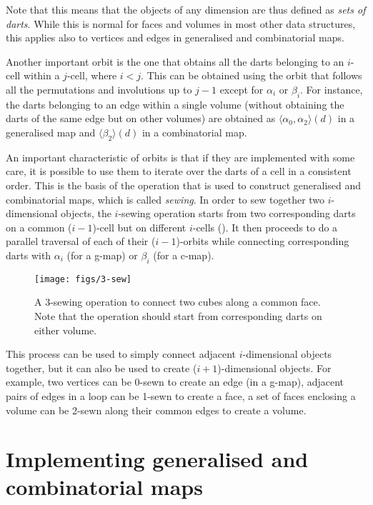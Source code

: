 Note that this means that the objects of any dimension are thus defined as \emph{sets of darts}.
While this is normal for faces and volumes in most other data structures, this applies also to vertices and edges in generalised and combinatorial maps.

Another important orbit is the one that obtains all the darts belonging to an \(i\)-cell within a \(j\)-cell, where \(i < j\).
This can be obtained using the orbit that follows all the permutations and involutions up to \(j-1\) except for \(\alpha_i\) or \(\beta_i\).
For instance, the darts belonging to an edge within a single volume (without obtaining the darts of the same edge but on other volumes) are obtained as \(\langle \alpha_0, \alpha_2 \rangle(d)\) in a generalised map and \(\langle \beta_2 \rangle(d)\) in a combinatorial map.

An important characteristic of orbits is that if they are implemented with some care, it is possible to use them to iterate over the darts of a cell in a consistent order.
This is the basis of the operation that is used to construct generalised and combinatorial maps, which is called \emph{sewing}.
In order to sew together two \(i\)-dimensional objects, the \(i\)-sewing operation starts from two corresponding darts on a common (\(i-1\))-cell but on different \(i\)-cells ().
It then proceeds to do a parallel traversal of each of their (\(i-1\))-orbits while connecting corresponding darts with \(\alpha_i\) (for a g-map) or \(\beta_i\) (for a c-map).

\begin{figure}
\centering
\texttt{[image: figs/3-sew]}
\caption{A 3-sewing operation to connect two cubes along a common face.
Note that the operation should start from corresponding darts on either volume.}%
\label{fig:3-sew}
\end{figure}

This process can be used to simply connect adjacent \(i\)-dimensional objects together, but it can also be used to create (\(i+1\))-dimensional objects.
For example, two vertices can be 0-sewn to create an edge (in a g-map), adjacent pairs of edges in a loop can be 1-sewn to create a face, a set of faces enclosing a volume can be 2-sewn along their common edges to create a volume.

\section{Implementing generalised and combinatorial maps}

